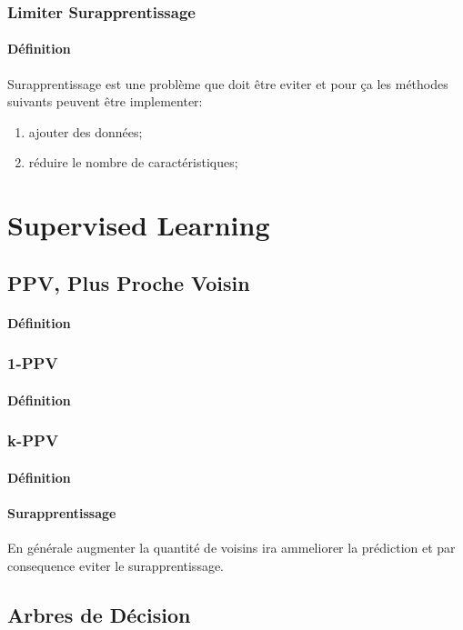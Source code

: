 \documentclass{article}
\begin{document}
\subsubsection{Limiter Surapprentissage}
\paragraph{Définition}Surapprentissage est une problème que doit être eviter et pour ça les méthodes suivants peuvent être implementer:
\begin{enumerate}[noitemsep]
    \item ajouter des données;
    \item réduire le nombre de caractéristiques;
\end{enumerate}



\section{Supervised Learning}
\subsection{PPV, Plus Proche Voisin}
\paragraph{Définition}

\subsubsection{1-PPV}
\paragraph{Définition}
\subsubsection{k-PPV}
\paragraph{Définition}

\paragraph{Surapprentissage}En générale augmenter la quantité de voisins ira ammeliorer la prédiction et par consequence eviter le surapprentissage.


\subsection{Arbres de Décision}
\end{document}
